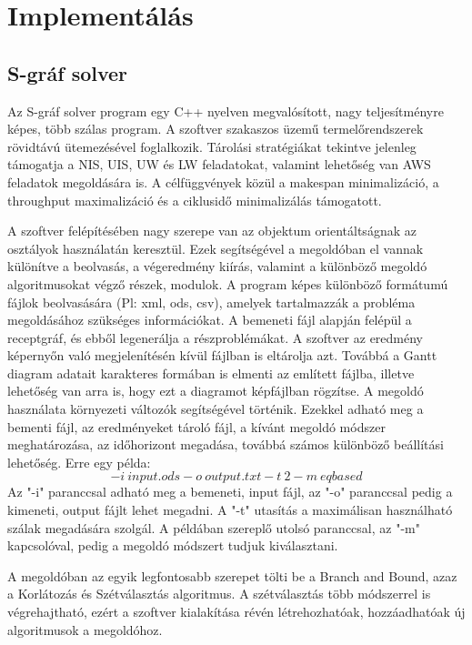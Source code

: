 \chapter{Implementálás}
\section{S-gráf solver}
Az S-gráf solver program egy C++ nyelven megvalósított, nagy teljesítményre képes, több szálas program.
A szoftver szakaszos üzemű termelőrendszerek rövidtávú ütemezésével foglalkozik.
Tárolási stratégiákat tekintve jelenleg támogatja a NIS, UIS, UW és LW feladatokat, valamint lehetőség van AWS feladatok megoldására is.
A célfüggvények közül a makespan minimalizáció, a throughput maximalizáció és a ciklusidő minimalizálás támogatott. 

A szoftver felépítésében nagy szerepe van az objektum orientáltságnak az osztályok használatán keresztül.
Ezek segítségével a megoldóban el vannak különítve a beolvasás, a végeredmény kiírás, valamint a különböző megoldó algoritmusokat végző részek, modulok.
A program képes különböző formátumú fájlok beolvasására (Pl: xml, ods, csv), amelyek tartalmazzák a probléma megoldásához szükséges információkat.
A bemeneti fájl alapján felépül a receptgráf, és ebből legenerálja a részproblémákat.
A szoftver az eredmény képernyőn való megjelenítésén kívül fájlban is eltárolja azt.
Továbbá a Gantt diagram adatait karakteres formában is elmenti az említett fájlba, illetve lehetőség van arra is, hogy ezt a diagramot képfájlban rögzítse.
A megoldó használata környezeti változók segítségével történik.
Ezekkel adható meg a bementi fájl, az eredményeket tároló fájl, a kívánt megoldó módszer meghatározása, az időhorizont megadása, továbbá számos különböző beállítási lehetőség.
Erre egy példa: $$-i\:input.ods -o\: output.txt -t\:2 -m\:eqbased$$ 
Az "-i" paranccsal adható meg a bemeneti, input fájl, az "-o" paranccsal pedig a kimeneti, output fájlt lehet megadni.
A "-t" utasítás a maximálisan használható szálak megadására szolgál.
A példában szereplő utolsó paranccsal, az "-m" kapcsolóval, pedig a megoldó módszert tudjuk kiválasztani.

A megoldóban az egyik legfontosabb szerepet tölti be a Branch and Bound, azaz a Korlátozás és Szétválasztás algoritmus.
A szétválasztás több módszerrel is végrehajtható, ezért a szoftver kialakítása révén létrehozhatóak, hozzáadhatóak új algoritmusok a megoldóhoz.

